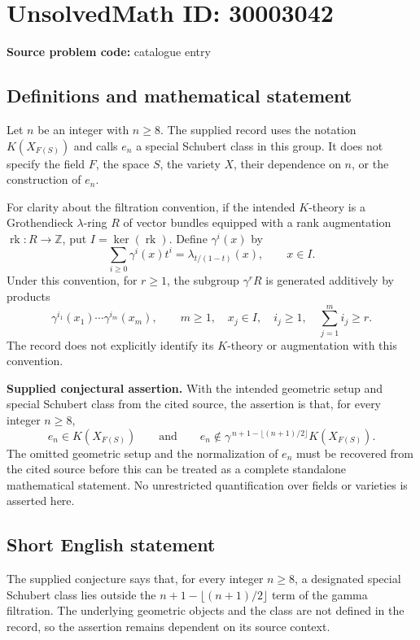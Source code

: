 \documentclass[11pt]{article}
\newcommand{\Z}{\mathbb{Z}}
\begin{document}
\section*{UnsolvedMath ID: 30003042}
\textbf{Source problem code:} catalogue entry
\subsection{Definitions and mathematical statement}
Let \(n\) be an integer with \(n\geq 8\). The supplied record uses the notation \(K(X_{F(S)})\) and calls \(e_n\) a special Schubert class in this group. It does not specify the field \(F\), the space \(S\), the variety \(X\), their dependence on \(n\), or the construction of \(e_n\).

For clarity about the filtration convention, if the intended \(K\)-theory is a Grothendieck \(\lambda\)-ring \(R\) of vector bundles equipped with a rank augmentation \(\operatorname{rk}\colon R\to\Z\), put \(I=\ker(\operatorname{rk})\). Define \(\gamma^i(x)\) by
\[
\sum_{i\geq 0}\gamma^i(x)t^i=\lambda_{t/(1-t)}(x),\qquad x\in I.
\]
Under this convention, for \(r\geq 1\), the subgroup \(\gamma^rR\) is generated additively by products
\[
\gamma^{i_1}(x_1)\cdots\gamma^{i_m}(x_m),\qquad
m\geq 1,\quad x_j\in I,\quad i_j\geq 1,\quad \sum_{j=1}^m i_j\geq r.
\]
The record does not explicitly identify its \(K\)-theory or augmentation with this convention.

\textbf{Supplied conjectural assertion.} With the intended geometric setup and special Schubert class from the cited source, the assertion is that, for every integer \(n\geq 8\),
\[
e_n\in K(X_{F(S)})\qquad\text{and}\qquad
e_n\notin\gamma^{\,n+1-\lfloor(n+1)/2\rfloor}K(X_{F(S)}).
\]
The omitted geometric setup and the normalization of \(e_n\) must be recovered from the cited source before this can be treated as a complete standalone mathematical statement. No unrestricted quantification over fields or varieties is asserted here.
\subsection{Short English statement}
The supplied conjecture says that, for every integer \(n\geq 8\), a designated special Schubert class lies outside the \(n+1-\lfloor(n+1)/2\rfloor\) term of the gamma filtration. The underlying geometric objects and the class are not defined in the record, so the assertion remains dependent on its source context.
\end{document}
